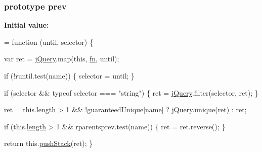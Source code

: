 \subsubsection[{\texorpdfstring{prev}{prev}}]{ {\bf prototype} prev}\hypertarget{jquery-2_82_81-vsdoc_8js_a7352f8050024693a3c6cce9e507d4af2}{}\label{jquery-2_82_81-vsdoc_8js_a7352f8050024693a3c6cce9e507d4af2}
{\bfseries Initial value\+:}
\begin{DoxyCode}
= \textcolor{keyword}{function} (until, selector) \{
        

        var ret = \hyperlink{jquery-2_82_81-vsdoc_8js_add5237586d970a38a81f990e8eb28c6c}{jQuery}.map(\textcolor{keyword}{this}, \hyperlink{jquery-2_82_81-vsdoc_8js_acef6bdaf6b9b20fdcca1ea86f0902c3b}{fn}, until);

        \textcolor{keywordflow}{if} (!runtil.test(name)) \{
            selector = until;
        \}

        \textcolor{keywordflow}{if} (selector && typeof selector === \textcolor{stringliteral}{"string"}) \{
            ret = \hyperlink{jquery-2_82_81-vsdoc_8js_add5237586d970a38a81f990e8eb28c6c}{jQuery}.filter(selector, ret);
        \}

        ret = this.\hyperlink{jquery-2_82_81-vsdoc_8js_aa7de35d58da66d9944ab9cbe82c19640}{length} > 1 && !guaranteedUnique[name] ? \hyperlink{jquery-2_82_81-vsdoc_8js_add5237586d970a38a81f990e8eb28c6c}{jQuery}.unique(ret) : ret;

        \textcolor{keywordflow}{if} (this.\hyperlink{jquery-2_82_81-vsdoc_8js_aa7de35d58da66d9944ab9cbe82c19640}{length} > 1 && rparentsprev.test(name)) \{
            ret = ret.reverse();
        \}

        \textcolor{keywordflow}{return} this.\hyperlink{jquery-2_82_81-vsdoc_8js_afc3a7db1ef2b526338c06c07cecccd44}{pushStack}(ret);
    \}
\end{DoxyCode}
